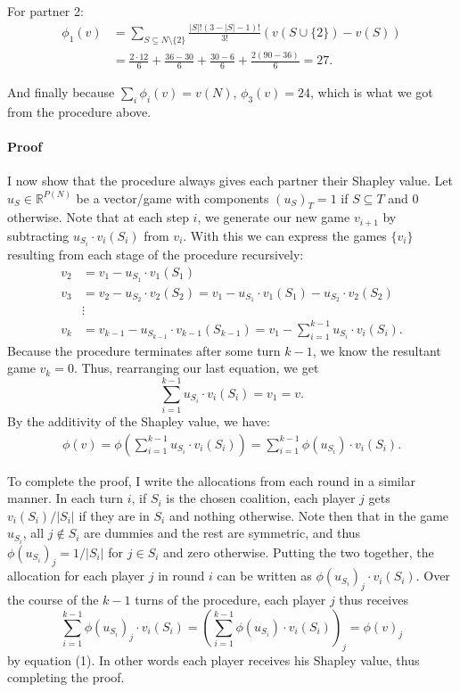 \documentclass[12pt]{article}
\begin{document}
For partner 2:
\begin{align*}
  \phi_1(v)
  & = \sum_{S\subseteq N\setminus \{2\}}\frac{|S|!(3-|S|-1)!}{3!}(v(S\cup \{2\})-
    v(S))\\
  & = \frac{2\cdot 12}{6} + \frac{36-30}{6} + \frac{30-6}{6} + \frac{2(90-36)}
    {6} = 27.
\end{align*}

And finally because $\sum_i\phi_i(v) = v(N)$, $\phi_3(v) = 24$, which is what we
got from the procedure above.

\paragraph{Proof}
I now show that the procedure always gives each partner their Shapley value.
Let $u_S\in \mathbb{R}^{P(N)}$ be a vector/game with components $(u_S)_T = 1$ if
$S \subseteq T$ and 0 otherwise. Note that at each step $i$, we generate our
new game $v_{i+1}$ by subtracting $u_{S_i}\cdot v_i(S_i)$ from $v_{i}$.
With this we can express the games $\{v_i\}$
resulting from each stage of the procedure recursively:
\begin{align*}
  v_2 &= v_1 - u_{S_1}\cdot v_1(S_1)\\
  v_3 &= v_2 - u_{S_2}\cdot v_2(S_2) = v_1 - u_{S_1}\cdot v_1(S_1) - u_{S_2}\cdot
        v_2(S_2)\\
      & \vdots\\
  v_k &= v_{k-1} - u_{S_{k-1}}\cdot v_{k-1}(S_{k-1}) = v_1 - \sum_{i=1}^{k-1}
        u_{S_i}\cdot v_i(S_i).
\end{align*}
Because the procedure terminates after some turn $k-1$, we know the resultant
game $v_k = 0$. Thus, rearranging our last equation, we get
\begin{displaymath}
  \sum_{i=1}^{k-1}u_{S_i}\cdot v_i(S_i) = v_1 = v.
\end{displaymath}
By the additivity of the Shapley value, we have:
\begin{align}
  \phi(v) = \phi\left(\sum_{i=1}^{k-1}u_{S_i}\cdot v_i(S_i)\right) =
  \sum_{i=1}^{k-1}\phi(u_{S_i})\cdot v_i(S_i).
\end{align}

To complete the proof, I write the allocations from each round in a similar
manner. In each turn $i$, if $S_i$ is the chosen coalition, each player $j$
gets $v_i(S_i)/|S_i|$ if they are in $S_i$ and nothing otherwise. Note then that
in the game $u_{S_i}$, all $j\notin S_i$ are dummies and the rest are symmetric,
and thus $\phi(u_{S_i})_j = 1/|S_i|$ for $j\in S_i$ and zero otherwise. Putting
the two together, the allocation for each player $j$ in round $i$ can be written
as $\phi(u_{S_i})_j\cdot v_i(S_i)$. Over the course of the $k-1$ turns of the
procedure, each player $j$ thus receives
\begin{displaymath}
  \sum_{i=1}^{k-1}\phi(u_{S_i})_j\cdot v_i(S_i) = \left(\sum_{i=1}^{k-1}\phi(u_{S_i})
    \cdot v_i(S_i)\right)_j = \phi(v)_j
\end{displaymath}
by equation (1). In other words each player receives his Shapley value, thus
completing the proof.
\end{document}
